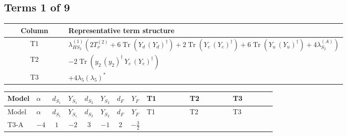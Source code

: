 \documentclass[8pt]{article}
\begin{document}
\begin{landscape}
\subsection*{Terms 1 of 9}
\begin{center}
\begin{tabular}{@{}c >{\raggedright\arraybackslash}p{0.82\linewidth}@{}}
\toprule
Column & Representative term structure \\
\midrule
T1 & \(\displaystyle {\lambda_{HS_2}^{(1)}} (2 T_{\nu}^{(2)}+6 \operatorname{Tr}\!\left({Y_d}\,\left({Y_d}\right)^{\dagger}\right)+2 \operatorname{Tr}\!\left({Y_e}\,\left({Y_e}\right)^{\dagger}\right)+6 \operatorname{Tr}\!\left({Y_u}\,\left({Y_u}\right)^{\dagger}\right)+4 {\lambda_{S_2}^{(A)}})\) \\
\midrule
T2 & \(\displaystyle -2 \operatorname{Tr}\!\left({y_2}\,\left({y_2}\right)^{\dagger}\,{Y_e}\,\left({Y_e}\right)^{\dagger}\right)\) \\
\midrule
T3 & \(\displaystyle +4 {\lambda_5} \left({\lambda_5}\right)^{*}\) \\
\midrule
\bottomrule
\end{tabular}
\end{center}
\smallskip
\tiny
\begin{longtable}{@{}llcccccc >{\raggedright\arraybackslash}p{0.21\linewidth} >{\raggedright\arraybackslash}p{0.21\linewidth} >{\raggedright\arraybackslash}p{0.21\linewidth}@{}}
\toprule
Model & $\alpha$ & $d_{S_1}$ & $Y_{S_1}$ & $d_{S_2}$ & $Y_{S_2}$ & $d_F$ & $Y_F$ & T1 & T2 & T3 \\
\midrule
\endfirsthead
\toprule
Model & $\alpha$ & $d_{S_1}$ & $Y_{S_1}$ & $d_{S_2}$ & $Y_{S_2}$ & $d_F$ & $Y_F$ & T1 & T2 & T3 \\
\midrule
\endhead
T3-A & $-4$ & $1$ & $-2$ & $3$ & $-1$ & $2$ & $-\frac{3}{2}$ & \scriptsize\adjustbox{max width=\linewidth}{$\begin{gathered} {\lambda_{HS_2}^{(1)}} (2 T_{\nu}^{(2)}+6 \operatorname{Tr}\!\left({Y_d}\,\left({Y_d}\right)^{\dagger}\right)+2 \operatorname{Tr}\!\left({Y_e}\,\left({Y_e}\right)^{\dagger}\right)+6 \operatorname{Tr}\!\left({Y_u}\,\left({Y_u}\right)^{\dagger}\right)+4 {\lambda_{S_2}^{(A)}})\end{gathered}$} & \scriptsize\adjustbox{max width=\linewidth}{$\begin{gathered} -2 \operatorname{Tr}\!\left({y_2}\,\left({y_2}\right)^{\dagger}\,{Y_e}\,\left({Y_e}\right)^{\dagger}\right)\end{gathered}$} & \scriptsize\adjustbox{max width=\linewidth}{$\begin{gathered} +4 {\lambda_5} \left({\lambda_5}\right)^{*}\end{gathered}$} \\

\end{longtable}
\end{landscape}
\end{document}
